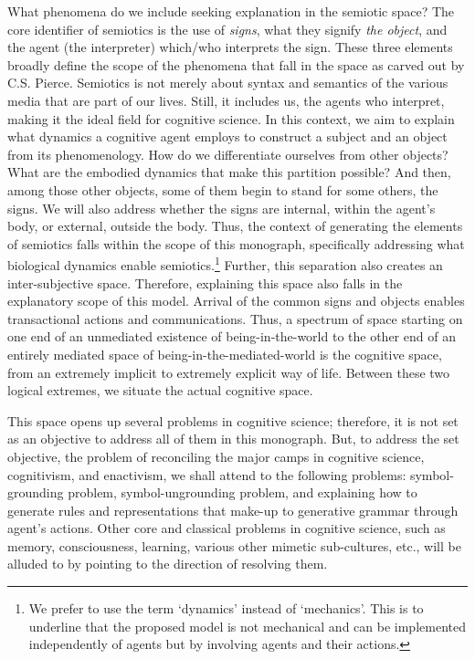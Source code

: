 What phenomena do we include seeking explanation in the semiotic space? The core identifier of semiotics is the use of \textit{signs}, what they signify \textit{the object}, and the agent  (the interpreter) which/who interprets the sign. These three elements broadly define the scope of the phenomena that fall in the space as carved out by C.S. Pierce.\cite{peirce1992essential} Semiotics is not merely about syntax and semantics of the various media that are part of our lives. Still, it includes us, the agents who interpret, making it the ideal field for cognitive science. In this context, we aim to explain what dynamics a cognitive agent employs to construct a subject and an object from its phenomenology. How do we differentiate ourselves from other objects? What are the embodied dynamics that make this partition possible? And then, among those other objects, some of them begin to stand for some others, the signs. We will also address whether the signs are internal, within the agent's body, or external, outside the body. Thus, the context of generating the elements of semiotics falls within the scope of this monograph, specifically addressing what biological dynamics enable semiotics.\footnote{We prefer to use the term `dynamics' instead of `mechanics'.  This is to underline that the proposed model is not mechanical and can be implemented independently of agents but by involving agents and their actions.}  Further, this separation also creates an inter-subjective space. Therefore, explaining this space also falls in the explanatory scope of this model.  Arrival of the common signs and objects enables transactional actions and communications.  Thus, a spectrum of space starting on one end of an unmediated existence of being-in-the-world to the other end of an entirely mediated space of being-in-the-mediated-world is the cognitive space, from an extremely implicit to extremely explicit way of life. Between these two logical extremes, we situate the actual cognitive space.

This space opens up several problems in cognitive science; therefore, it is not set as an objective to address all of them in this monograph.  But, to address the set objective, the problem of reconciling the major camps in cognitive science, cognitivism, and enactivism, we shall attend to the following problems: symbol-grounding problem\cite{harnad1990symbol}, symbol-ungrounding problem\cite{dove-ungrounding}, and explaining how to generate rules and representations that make-up to generative grammar through agent's actions. Other core and classical problems in cognitive science, such as memory, consciousness, learning, various other mimetic sub-cultures, etc., will be alluded to by pointing to the direction of resolving them.

